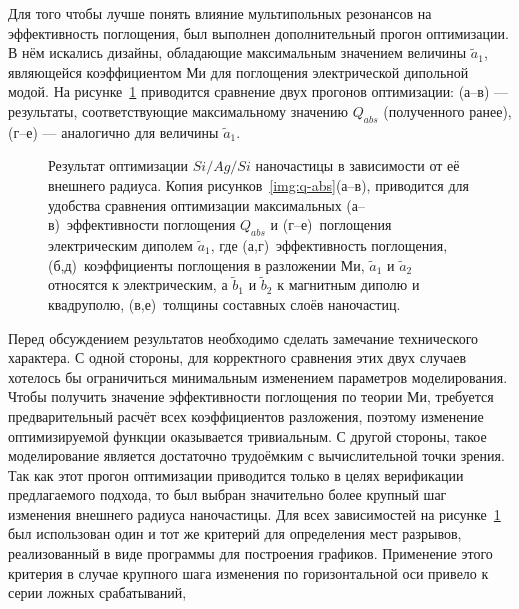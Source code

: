 Для того чтобы лучше понять влияние мультипольных резонансов на
эффективность поглощения, был выполнен дополнительный прогон
оптимизации. В нём искались дизайны, обладающие максимальным значением
величины $\tilde{a}_1$, являющейся коэффициентом Ми для поглощения
электрической дипольной модой. На рисунке~\ref{img:q-abs-a1}
приводится сравнение двух прогонов оптимизации: (а--в) --- результаты,
соответствующие максимальному значению $Q_{abs}$ (полученного ранее),
(г--е) --- аналогично для величины $\tilde{a}_1$.
\begin{figure}[t]
  \begin{minipage}[ht]{0.495\linewidth}
  \end{minipage}
  \hfill
  \begin{minipage}[ht]{0.495\linewidth}
  \end{minipage}
  \caption{ Результат оптимизации $Si/Ag/Si$ наночастицы в
    зависимости от её внешнего радиуса.  Копия
    рисунков~\ref{img:q-abs}(а--в), приводится для удобства сравнения
    оптимизации максимальных (а--в)~эффективности поглощения $Q_{abs}$
    и (г--е)~поглощения электрическим диполем $\tilde{a}_1$, где (а,г)~эффективность
    поглощения, (б,д)~коэффициенты поглощения в разложении Ми, 
    $\tilde{a}_1$ и $\tilde{a}_2$ относятся к электрическим, а
    $\tilde{b}_1$ и $\tilde{b}_2$ к магнитным диполю и квадруполю,
    (в,е)~толщины составных слоёв наночастиц.}
  \label{img:q-abs-a1}
\end{figure}
Перед обсуждением результатов необходимо сделать замечание
технического характера.  С одной стороны, для корректного сравнения
этих двух случаев хотелось бы ограничиться минимальным изменением
параметров моделирования.  Чтобы получить значение эффективности
поглощения по теории Ми, требуется предварительный расчёт всех
коэффициентов разложения, поэтому изменение оптимизируемой функции
оказывается тривиальным.  С другой стороны, такое моделирование
является достаточно трудоёмким с вычислительной точки зрения.  Так как
этот прогон оптимизации приводится только в целях верификации
предлагаемого подхода, то был выбран значительно более крупный шаг
изменения внешнего радиуса наночастицы.  Для всех зависимостей на
рисунке~\ref{img:q-abs-a1} был использован один и тот же критерий для
определения мест разрывов, реализованный в виде программы для
построения графиков.  Применение этого критерия в случае крупного шага
изменения по горизонтальной оси привело к серии ложных срабатываний,
